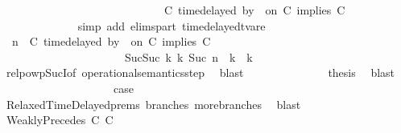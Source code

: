 \begin{isabellebody}
\ \ \ \ \ \ \ \ \ \ \ \ \ \ \ \ \ \ \ \ \ \ \ \ \ \ \ \ {\isasymtriangleright}\ {\isacharparenleft}{\isacharparenleft}C\ time{\isacharminus}delayed{\isasymbowtie}\ by\ {\isasymdelta}{\isasymtau}\ on\ C\ implies\ C\ {\isacharhash}\ {\isasymPhi}{\isacharparenright}{\isacharparenright}{\isacartoucheclose}\isanewline
\ \ \ \ \ \ \ \ \ \ \ \ \isamarkupfalse%
\ {\isacharparenleft}simp\ add{\isacharcolon}\ elims{\isacharunderscore}part\ timedelayed{\isacharunderscore}tvar{\isacharunderscore}e{}{\isacharparenright}\isanewline
\ \ \ \ \ \ \ \ \ \ \isamarkupfalse%
\ \isamarkupfalse%
\ {\isacartoucheopen}{\isacharparenleft}{\isasymGamma}{\isacharcomma}\ n\ {\isasymturnstile}\ {\isacharparenleft}{\isacharparenleft}C\ time{\isacharminus}delayed{\isasymbowtie}\ by\ {\isasymdelta}{\isasymtau}\ on\ C\ implies\ C\ {\isacharhash}\ {\isasymPsi}{\isacharparenright}\ {\isasymtriangleright}\ {\isasymPhi}{\isacharparenright}\isanewline
\ \ \ \ \ \ \ \ \ \ \ \ \ \ \ \ \ \ \ \ \ \ {\isasymhookrightarrow}\isactrlbsup Suc{\isacharparenleft}Suc\ k{\isacharparenright}\isactrlesup \ {\isacharparenleft}{\isasymGamma}\isactrlsub k{\isacharcomma}\ Suc\ n\ {\isasymturnstile}\ {\isasymPsi}\isactrlsub k\ {\isasymtriangleright}\ {\isasymPhi}\isactrlsub k{\isacharparenright}{\isacartoucheclose}\isanewline
\ \ \ \ \ \ \ \ \ \ \ \ \isamarkupfalse%
\ relpowp{\isacharunderscore}Suc{\isacharunderscore}I{}{\isacharbrackleft}of\ {\isacartoucheopen}operational{\isacharunderscore}semantics{\isacharunderscore}step{\isacartoucheclose}{\isacharbrackright}\ \isamarkupfalse%
\ blast\isanewline
\ \ \ \ \ \ \ \ \ \ \isamarkupfalse%
\ {\isacharasterisk}\ \isamarkupfalse%
\ {\isacharquery}thesis\ \isamarkupfalse%
\ blast\isanewline
\ \ \ \ \ \ \ \ \isamarkupfalse%
\isanewline
\ \ \ \ \ \ \ \ \isamarkupfalse%
\ \isamarkupfalse%
\ {\isacharquery}case\ \isamarkupfalse%
\ RelaxedTimeDelayed{\isachardot}prems{\isacharparenleft}{}{\isacharparenright}\ branches\ more{\isacharunderscore}branches\ \isamarkupfalse%
\ blast\isanewline
\ \ \isamarkupfalse%
\isanewline
\ \ \ \ \isamarkupfalse%
\ {\isacharparenleft}WeaklyPrecedes\ C\ C\isanewline

\end{isabellebody}
